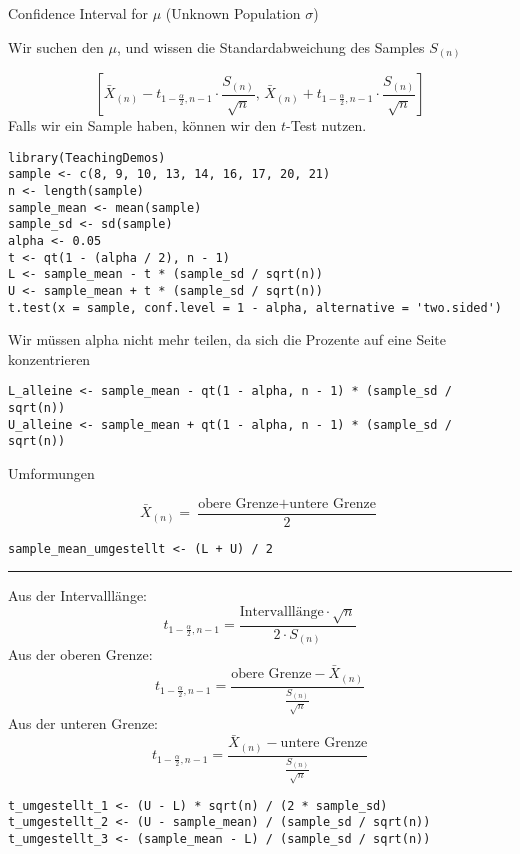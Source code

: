 \begin{multicols*}{2}

\begin{center}
     \Large{Confidence Interval for $\mu$ (Unknown Population $\sigma$)}
\end{center}
\begin{center}
     \Large{Wir suchen den $\mu$, und wissen die Standardabweichung des Samples $S_{(n)}$}
\end{center}

$$
\left[ \bar{X}_{(n)} - t_{1 - \frac{\alpha}{2}, n-1} \cdot \frac{S_{(n)}}{\sqrt{n}}, \, \bar{X}_{(n)} + t_{1 - \frac{\alpha}{2}, n-1} \cdot \frac{S_{(n)}}{\sqrt{n}} \right]
$$
Falls wir ein Sample haben, können wir den \(t\)-Test nutzen.
\begin{lstlisting}
library(TeachingDemos)
sample <- c(8, 9, 10, 13, 14, 16, 17, 20, 21)
n <- length(sample)
sample_mean <- mean(sample)
sample_sd <- sd(sample)
alpha <- 0.05
t <- qt(1 - (alpha / 2), n - 1)
L <- sample_mean - t * (sample_sd / sqrt(n))
U <- sample_mean + t * (sample_sd / sqrt(n))
t.test(x = sample, conf.level = 1 - alpha, alternative = 'two.sided')
\end{lstlisting}

Wir müssen alpha nicht mehr teilen, da sich die Prozente auf eine Seite konzentrieren
\begin{lstlisting}
L_alleine <- sample_mean - qt(1 - alpha, n - 1) * (sample_sd / sqrt(n))
U_alleine <- sample_mean + qt(1 - alpha, n - 1) * (sample_sd / sqrt(n))
\end{lstlisting}
\begin{center}
     \Large{Umformungen}
\end{center}
$$
\bar{X}_{(n)} = \frac{\text{obere Grenze} + \text{untere Grenze}}{2}
$$
\begin{lstlisting}
sample_mean_umgestellt <- (L + U) / 2
\end{lstlisting}

\hrule
{}

Aus der Intervalllänge:
$$
t_{1 - \frac{\alpha}{2}, n-1} = \frac{\text{Intervalllänge} \cdot \sqrt{n}}{2 \cdot S_{(n)}}
$$
Aus der oberen Grenze:
$$
t_{1 - \frac{\alpha}{2}, n-1} = \frac{\text{obere Grenze} - \bar{X}_{(n)}}{\frac{S_{(n)}}{\sqrt{n}}}
$$
Aus der unteren Grenze:
$$
t_{1 - \frac{\alpha}{2}, n-1} = \frac{\bar{X}_{(n)} - \text{untere Grenze}}{\frac{S_{(n)}}{\sqrt{n}}}
$$
\begin{lstlisting}
t_umgestellt_1 <- (U - L) * sqrt(n) / (2 * sample_sd)
t_umgestellt_2 <- (U - sample_mean) / (sample_sd / sqrt(n))
t_umgestellt_3 <- (sample_mean - L) / (sample_sd / sqrt(n))
\end{lstlisting}
\columnbreak


\end{multicols*}
